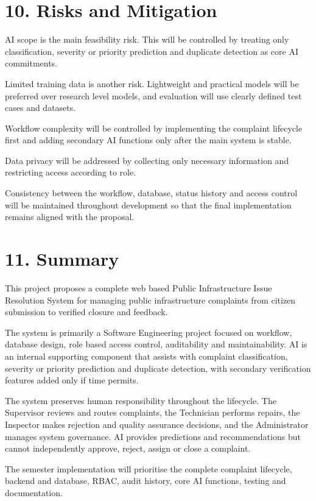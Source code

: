 \documentclass[12pt,a4paper]{article}
\begin{document}
\section{10. Risks and Mitigation}
AI scope is the main feasibility risk. This will be controlled by treating only classification, severity or priority prediction and duplicate detection as core AI commitments.

Limited training data is another risk. Lightweight and practical models will be preferred over research level models, and evaluation will use clearly defined test cases and datasets.

Workflow complexity will be controlled by implementing the complaint lifecycle first and adding secondary AI functions only after the main system is stable.

Data privacy will be addressed by collecting only necessary information and restricting access according to role.

Consistency between the workflow, database, status history and access control will be maintained throughout development so that the final implementation remains aligned with the proposal.

\section{11. Summary}
This project proposes a complete web based Public Infrastructure Issue Resolution System for managing public infrastructure complaints from citizen submission to verified closure and feedback.

The system is primarily a Software Engineering project focused on workflow, database design, role based access control, auditability and maintainability. AI is an internal supporting component that assists with complaint classification, severity or priority prediction and duplicate detection, with secondary verification features added only if time permits.

The system preserves human responsibility throughout the lifecycle. The Supervisor reviews and routes complaints, the Technician performs repairs, the Inspector makes rejection and quality assurance decisions, and the Administrator manages system governance. AI provides predictions and recommendations but cannot independently approve, reject, assign or close a complaint.

The semester implementation will prioritise the complete complaint lifecycle, backend and database, RBAC, audit history, core AI functions, testing and documentation.
\end{document}
